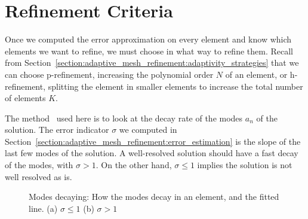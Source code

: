 \section{Refinement Criteria} \label{section:adaptive_mesh_refinement:refinement_criteria}

Once we computed the error approximation on every element and know which elements we want to refine,
we must choose in what way to refine them. Recall from
Section~\ref{section:adaptive_mesh_refinement:adaptivity_strategies} that we can choose
p-refinement, increasing the polynomial order $N$ of an element, or h-refinement, splitting the
element in smaller elements to increase the total number of elements $K$.

The method~\cite{Mavriplis1990} used here is to look at the decay rate of the modes $a_n$ of the
solution. The error indicator $\sigma$ we computed in
Section~\ref{section:adaptive_mesh_refinement:error_estimation} is the slope of the last few modes
of the solution. A well-resolved solution should have a fast decay of the modes, with $\sigma > 1$.
On the other hand, $\sigma \leqslant 1$ implies the solution is not well resolved as is.

\begin{figure}[H]
	\centering
	\hfill
	\caption{Modes decaying: How the modes decay in an element, and the fitted line. (a) $\sigma \leqslant 1$ (b) $\sigma > 1$}
	\label{fig:decaying_modes}
\end{figure}

